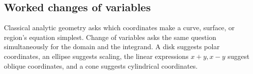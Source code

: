 
\subsection{Worked changes of variables}
\begin{center}
\end{center}
Classical analytic geometry asks which coordinates make a curve, surface,
or region's equation simplest. Change of variables asks the same question
simultaneously for the domain and the integrand. A disk suggests polar
coordinates, an ellipse suggests scaling, the linear expressions $x+y,x-y$
suggest oblique coordinates, and a cone suggests cylindrical coordinates.

